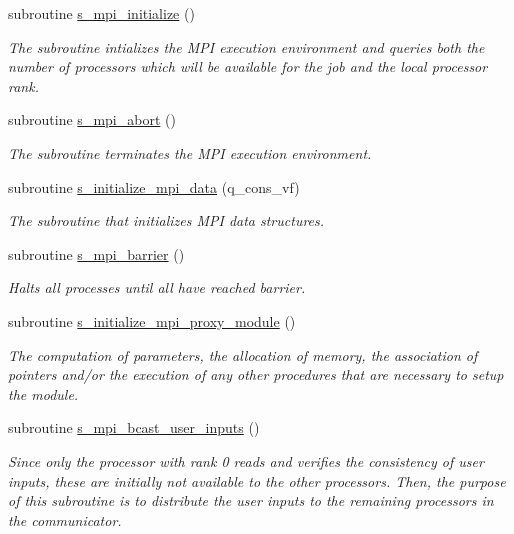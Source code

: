 \begin{DoxyCompactItemize}
\item 
subroutine \hyperlink{namespacem__mpi__proxy_a9bc4c617505152d3cc553e5bc25c1ee1}{s\+\_\+mpi\+\_\+initialize} ()
\begin{DoxyCompactList}\small\item\em The subroutine intializes the M\+PI execution environment and queries both the number of processors which will be available for the job and the local processor rank. \end{DoxyCompactList}\item 
subroutine \hyperlink{namespacem__mpi__proxy_a04ac565bad2b22dc045a5eeb4f516e2e}{s\+\_\+mpi\+\_\+abort} ()
\begin{DoxyCompactList}\small\item\em The subroutine terminates the M\+PI execution environment. \end{DoxyCompactList}\item 
subroutine \hyperlink{namespacem__mpi__proxy_a2ff35ede51e90c483969e44c31303415}{s\+\_\+initialize\+\_\+mpi\+\_\+data} (q\+\_\+cons\+\_\+vf)
\begin{DoxyCompactList}\small\item\em The subroutine that initializes M\+PI data structures. \end{DoxyCompactList}\item 
subroutine \hyperlink{namespacem__mpi__proxy_abfbc42cea69273bc9fa4a2d78f636eb1}{s\+\_\+mpi\+\_\+barrier} ()
\begin{DoxyCompactList}\small\item\em Halts all processes until all have reached barrier. \end{DoxyCompactList}\item 
subroutine \hyperlink{namespacem__mpi__proxy_a015ee2c0892e9cfcb858da8f27b646d5}{s\+\_\+initialize\+\_\+mpi\+\_\+proxy\+\_\+module} ()
\begin{DoxyCompactList}\small\item\em The computation of parameters, the allocation of memory, the association of pointers and/or the execution of any other procedures that are necessary to setup the module. \end{DoxyCompactList}\item 
subroutine \hyperlink{namespacem__mpi__proxy_a69660c5fe9302a8c0496b622fa3b5286}{s\+\_\+mpi\+\_\+bcast\+\_\+user\+\_\+inputs} ()
\begin{DoxyCompactList}\small\item\em Since only the processor with rank 0 reads and verifies the consistency of user inputs, these are initially not available to the other processors. Then, the purpose of this subroutine is to distribute the user inputs to the remaining processors in the communicator. \end{DoxyCompactList}\item 

\end{DoxyCompactItemize}
